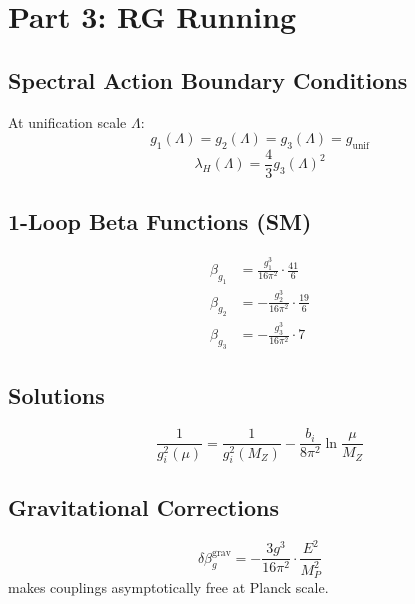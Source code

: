 \documentclass[11pt]{article}
\begin{document}
\section{Part 3: RG Running}

\subsection{Spectral Action Boundary Conditions}
At unification scale $\Lambda$:
\begin{equation}
g_1(\Lambda) = g_2(\Lambda) = g_3(\Lambda) = g_{\text{unif}}
\end{equation}
\begin{equation}
\lambda_H(\Lambda) = \frac{4}{3} g_3(\Lambda)^2
\end{equation}

\subsection{1-Loop Beta Functions (SM)}
\begin{align}
\beta_{g_1} &= \frac{g_1^3}{16\pi^2} \cdot \frac{41}{6} \\
\beta_{g_2} &= -\frac{g_2^3}{16\pi^2} \cdot \frac{19}{6} \\
\beta_{g_3} &= -\frac{g_3^3}{16\pi^2} \cdot 7
\end{align}

\subsection{Solutions}
\begin{equation}
\frac{1}{g_i^2(\mu)} = \frac{1}{g_i^2(M_Z)} - \frac{b_i}{8\pi^2} \ln\frac{\mu}{M_Z}
\end{equation}

\subsection{Gravitational Corrections}
\begin{equation}
\delta\beta_g^{\text{grav}} = -\frac{3g^3}{16\pi^2} \cdot \frac{E^2}{M_P^2}
\end{equation}
makes couplings asymptotically free at Planck scale.
\end{document}
